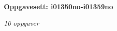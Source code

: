 \centerline{\bf Oppgavesett: i01350no-i01359no}
\vskip 10pt
\centerline{\it 10 oppgaver}\vskip 10pt
\vskip 10pt
